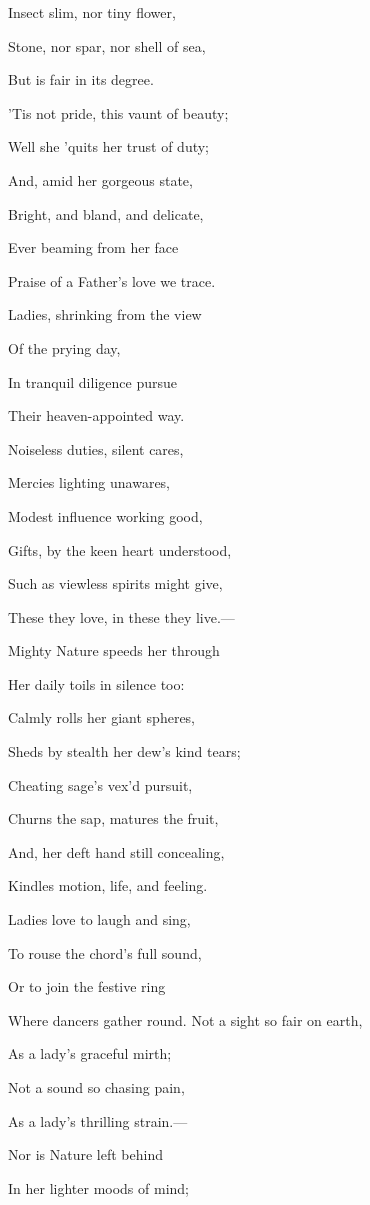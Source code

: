 Insect slim, nor tiny flower,

Stone, nor spar, nor shell of sea,

But is fair in its degree.

'Tis not pride, this vaunt of beauty;

Well she 'quits her trust of duty;

And, amid her gorgeous state,

Bright, and bland, and delicate,

Ever beaming from her face

Praise of a Father's love we trace. 

Ladies, shrinking from the view

Of the prying day,

In tranquil diligence pursue

Their heaven-appointed way.

Noiseless duties, silent cares,

Mercies lighting unawares,

Modest influence working good,

Gifts, by the keen heart understood,

Such as viewless spirits might give,

These they love, in these they live.—

Mighty Nature speeds her through

Her daily toils in silence too:

Calmly rolls her giant spheres,

Sheds by stealth her dew's kind tears;

Cheating sage's vex'd pursuit,

Churns the sap, matures the fruit,

And, her deft hand still concealing,

Kindles motion, life, and feeling.

Ladies love to laugh and sing,

To rouse the chord's full sound,

Or to join the festive ring

Where dancers gather round.
Not a sight so fair on earth,

As a lady's graceful mirth;

Not a sound so chasing pain,

As a lady's thrilling strain.—

Nor is Nature left behind

In her lighter moods of mind;

